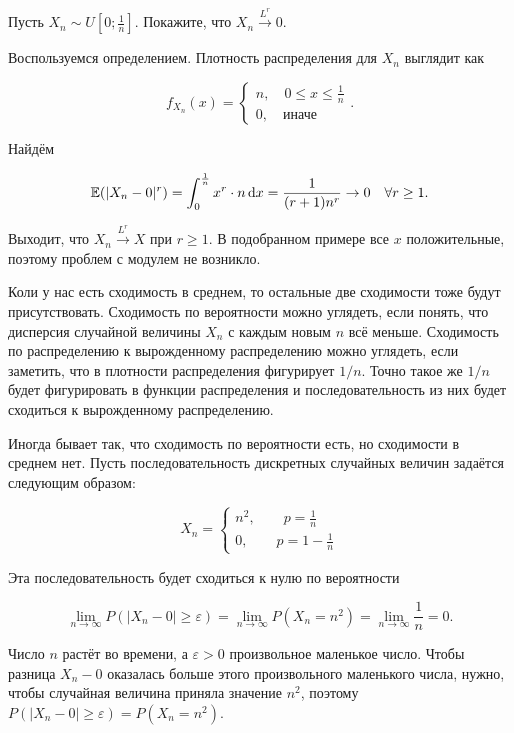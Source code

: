 \documentclass[12pt, a4paper, oneside]{article}
\begin{document}
\begin{problem}{ } 
Пусть $X_n \sim U \left[ 0;\frac{1}{n} \right]$. Покажите, что $X_n \overset{L^r}{\to} 0$.
\end{problem} 

\begin{sol}
Воспользуемся определением. Плотность распределения для $X_n$ выглядит как 

\[
f_{X_n}(x) = \begin{cases}  n, \quad 0 \le x \le \frac{1}{n} \\ 0, \quad \text{иначе} \end{cases}.
\]

Найдём 

\[
\mathbb{E}(|X_n - 0|^r) = \int_0^{\frac{1}{n}} x^r \cdot n \,\mathrm{d}x = \frac{1}{(r + 1) n^r} \to 0 \quad \forall r \ge 1.
\]

Выходит, что $X_n \overset{L^r}{\to} X$ при $r \ge 1$. В подобранном примере все $x$ положительные, поэтому проблем с модулем не возникло. 
\end{sol}

Коли у нас есть сходимость в среднем, то остальные две сходимости тоже будут присутствовать. Сходимость по вероятности можно углядеть, если понять, что дисперсия случайной величины $X_n$ с каждым новым $n$ всё меньше. Сходимость по распределению к вырожденному распределению можно углядеть, если заметить, что в плотности распределения фигурирует $1/n$. Точно такое же $1/n$ будет фигурировать в функции распределения и последовательность из них будет сходиться к вырожденному распределению.

 Иногда бывает так, что сходимость по вероятности есть, но сходимости в среднем нет. Пусть последовательность дискретных случайных величин задаётся следующим образом: 

$$
X_n = \begin{cases} n^2, \qquad p = \frac{1}{n} \\ 0, \qquad p = 1 - \frac{1}{n} \end{cases} 
$$

Эта последовательность будет сходиться к нулю по вероятности

$$
\lim_{n \to \infty} P(|X_n - 0| \ge \varepsilon) = \lim_{n \to \infty} P(X_n = n^2) = \lim_{n \to \infty} \frac{1}{n} = 0.
$$

Число $n$ растёт во времени, а $\varepsilon > 0$ произвольное маленькое число. Чтобы разница $X_n - 0$ оказалась больше этого произвольного маленького числа, нужно, чтобы случайная величина приняла значение $n^2$, поэтому $P(|X_n - 0| \ge \varepsilon) = P(X_n = n^2)$.  
\end{document}
